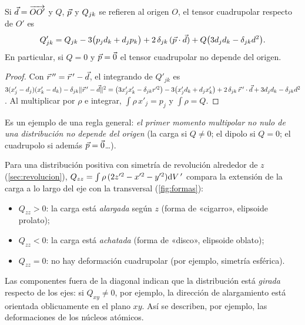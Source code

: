 \begin{proposicion}\label{prop:Q-origen}
Si $\vec{d}=\overrightarrow{OO'}$ y $Q$, $\vec{p}$ y $Q_{jk}$ se refieren al origen $O$, el tensor cuadrupolar respecto de $O'$ es
\begin{equation}\label{eq:Q-origen}
  Q'_{jk}=Q_{jk}-3\bigl(p_jd_k+d_jp_k\bigr)+2\,\delta_{jk}\,(\vec{p}\cdot\vec{d})+Q\bigl(3d_jd_k-\delta_{jk}d^{2}\bigr).
\end{equation}
En particular, si $Q=0$ y $\vec{p}=\vec{0}$ el tensor cuadrupolar no depende del origen.
\end{proposicion}
\begin{proof}
Con $\vec{r}\,''=\vec{r}\,'-\vec{d}$, el integrando de $Q'_{jk}$ es
$3(x'_j-d_j)(x'_k-d_k)-\delta_{jk}\lVert \vec{r}\,'-\vec{d}\rVert^{2}=\bigl(3x'_jx'_k-\delta_{jk}r'^{2}\bigr)-3\bigl(x'_jd_k+d_jx'_k\bigr)+2\,\delta_{jk}\,\vec{r}\,'\cdot\vec{d}+3d_jd_k-\delta_{jk}d^{2}$.
Al multiplicar por $\rho$ e integrar, $\int\rho\,x'_j=p_j$ y $\int\rho=Q$.
\end{proof}

Es un ejemplo de una regla general: \emph{el primer momento multipolar no nulo de una distribución no depende del origen} (la carga si $Q\neq0$; el dipolo si $Q=0$;
el cuadrupolo si además $\vec{p}=\vec{0}$\dots).

\begin{observacion}\label{obs:forma}
Para una distribución positiva con simetría de revolución alrededor de $z$ (\cref{sec:revolucion}), $Q_{zz}=\int\rho\,(2z'^{2}-x'^{2}-y'^{2})\mathrm{d} V\,'$ compara la extensión
de la carga a lo largo del eje con la transversal (\cref{fig:formas}):
\begin{itemize}
  \item $Q_{zz}>0$: la carga está \emph{alargada} según $z$ (forma de «cigarro», elipsoide prolato);
  \item $Q_{zz}<0$: la carga está \emph{achatada} (forma de «disco», elipsoide oblato);
  \item $Q_{zz}=0$: no hay deformación cuadrupolar (por ejemplo, simetría esférica).
\end{itemize}
Las componentes fuera de la diagonal indican que la distribución está \emph{girada} respecto de los ejes: si $Q_{xy}\neq0$, por ejemplo, la dirección de alargamiento está
orientada oblicuamente en el plano $xy$. Así se describen, por ejemplo, las deformaciones de los núcleos atómicos.
\end{observacion}




